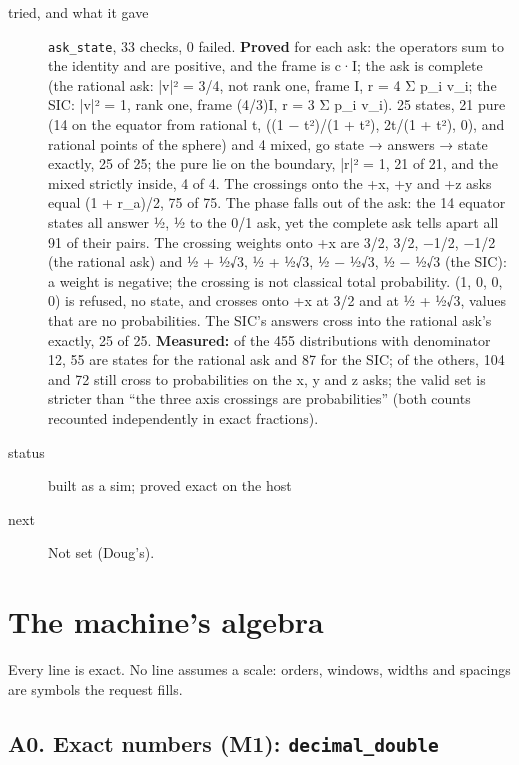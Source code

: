 \begin{description}
\item[{tried, and what it gave}] \texttt{ask\_\allowbreak{}state}, 33 checks, 0 failed. \textbf{Proved} for each ask: the operators sum to the identity and are positive, and the frame is c·I; the ask is complete (the rational ask: |v|² = 3/4, not rank one, frame I, r = 4 Σ p\_\allowbreak{}i v\_\allowbreak{}i; the SIC: |v|² = 1, rank one, frame (4/3)I, r = 3 Σ p\_\allowbreak{}i v\_\allowbreak{}i). 25 states, 21 pure (14 on the equator from rational t, ((1 − t²)/(1 + t²), 2t/(1 + t²), 0), and rational points of the sphere) and 4 mixed, go state → answers → state exactly, 25 of 25; the pure lie on the boundary, |r|² = 1, 21 of 21, and the mixed strictly inside, 4 of 4. The crossings onto the +x, +y and +z asks equal (1 + r\_\allowbreak{}a)/2, 75 of 75. The phase falls out of the ask: the 14 equator states all answer ½, ½ to the 0/1 ask, yet the complete ask tells apart all 91 of their pairs. The crossing weights onto +x are 3/2, 3/2, −1/2, −1/2 (the rational ask) and ½ + ½√3, ½ + ½√3, ½ − ½√3, ½ − ½√3 (the SIC): a weight is negative; the crossing is not classical total probability. (1, 0, 0, 0) is refused, no state, and crosses onto +x at 3/2 and at ½ + ½√3, values that are no probabilities. The SIC's answers cross into the rational ask's exactly, 25 of 25. \textbf{Measured:} of the 455 distributions with denominator 12, 55 are states for the rational ask and 87 for the SIC; of the others, 104 and 72 still cross to probabilities on the x, y and z asks; the valid set is stricter than “the three axis crossings are probabilities” (both counts recounted independently in exact fractions).
\item[{status}] built as a sim; proved exact on the host
\item[{next}] Not set (Doug's).
\end{description}

\section{\texorpdfstring{The machine's algebra}{The machine's algebra}}

Every line is exact. No line assumes a scale: orders, windows, widths and spacings are symbols the request fills.

\subsection{\texorpdfstring{A0. Exact numbers (M1): \texttt{decimal\_\allowbreak{}double}}{A0. Exact numbers (M1): decimal\_double}}

